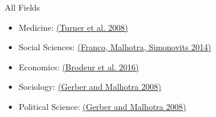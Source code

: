 \documentclass{beamer}
\begin{document}

\begin{frame}{All Fields}
\begin{itemize}[<.->]
\item Medicine: \href{http://www.nejm.org/doi/full/10.1056/nejmsa065779}{(Turner et al. 2008)}
\item Social Sciences: \href{http://science.sciencemag.org/content/345/6203/1502.short}{(Franco, Malhotra, Simonovits 2014)}
\item Economics: \href{https://www.aeaweb.org/articles.php?doi=10.1257/app.20150044}{(Brodeur et al. 2016)}
\item Sociology: \href{http://smr.sagepub.com/content/37/1/3.short}{(Gerber and Malhotra 2008)}
\item Political Science: \href{http://nowpublishers.com/article/Details/QJPS-8024}{(Gerber and Malhotra 2008)}
\end{itemize}
\end{frame}
\end{document}
